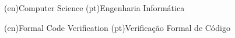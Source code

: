 %
%
%
%
\ntdegreename*(en){Computer Science}          %
\ntdegreename*(pt){Engenharia Informática} %



%
%
%
%
\ntspecialization*(en){Formal Code Verification}         %
\ntspecialization*(pt){Verificação Formal de Código} %



%
%
%
%
%
%






